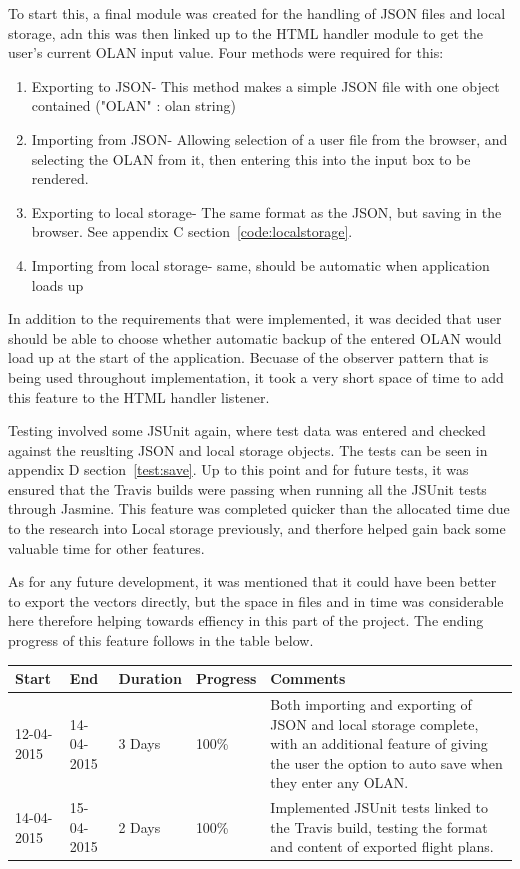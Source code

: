 To start this, a final module was created for the handling of JSON files and local storage, adn this was then linked up to the HTML handler module to get the user's current OLAN input value. Four methods were required for this:
\begin{enumerate}
	\item Exporting to JSON- This method makes a simple JSON file with one object contained ("OLAN" : olan string)
	\item Importing from JSON- Allowing selection of a user file from the browser, and selecting the OLAN from it, then entering this into the input box to be rendered.
	\item Exporting to local storage- The same format as the JSON, but saving in the browser. See appendix C section~\ref{code:localstorage}.
	\item Importing from local storage- same, should be automatic when application loads up
\end{enumerate}

In addition to the requirements that were implemented, it was decided that user should be able to choose whether automatic backup of the entered OLAN would load up at the start of the application. Becuase of the observer pattern that is being used throughout implementation, it took a very short space of time to add this feature to the HTML handler listener.

Testing involved some JSUnit again, where test data was entered and checked against the reuslting JSON and local storage objects. The tests can be seen in appendix D section~\ref{test:save}. Up to this point and for future tests, it was ensured that the Travis builds were passing when running all the JSUnit tests through Jasmine. This feature was completed quicker than the allocated time due to the research into Local storage previously, and therfore helped gain back some valuable time for other features.

As for any future development, it was mentioned that it could have been better to export the vectors directly, but the space in files and in time was considerable here therefore helping towards effiency in this part of the project. The ending progress of this feature follows in the table below.

\begin{table}[h]
\begin{tabular}{|l|l|l|l|p{7cm}|}
\hline
\textbf{Start} & \textbf{End} & \textbf{Duration} & \textbf{Progress} & \textbf{Comments}                                                                                                     \\ \hline
12-04-2015     & 14-04-2015   & 3 Days            & 100\%             &  Both importing and exporting of JSON and local storage complete, with an additional feature of giving the user the option to auto save when they enter any OLAN.\\ \hline
14-04-2015     & 15-04-2015   & 2 Days            & 100\%             &  Implemented JSUnit tests linked to the Travis build, testing the format and content of exported flight plans.\\ \hline
\end{tabular}
\end{table}


